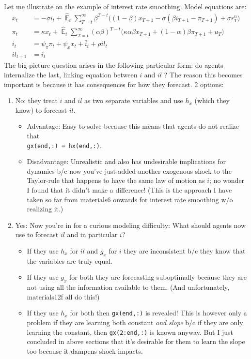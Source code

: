 \documentclass[11pt]{article}
\renewcommand{\[}{\begin{equation}}
\renewcommand{\]}{\end{equation}}
\DeclareMathOperator{\E}{\mathbb{E}}
\begin{document}
Let me illustrate on the example of interest rate smoothing. Model equations are:
\begin{align*}
x_t &=  -\sigma i_t +\hat{\E}_t \sum_{T=t}^{\infty} \beta^{T-t }\big( (1-\beta)x_{T+1} - \sigma(\beta i_{T+1} - \pi_{T+1}) +\sigma r_T^n \big)   \\
\pi_t &= \kappa x_t +\hat{\E}_t \sum_{T=t}^{\infty} (\alpha\beta)^{T-t }\big( \kappa \alpha \beta x_{T+1} + (1-\alpha)\beta \pi_{T+1} + u_T\big)  \\
i_t &= \psi_{\pi}\pi_t + \psi_{x} x_t   + \bar{i}_t + \rho il_t \\
il_{t+1} & = i_t 
\end{align*}
The big-picture question arises in the following particular form: do agents internalize the last, linking equation between $i$ and $il$ ?
The reason this becomes important is because it has consequences for how they forecast. 2 options:
\begin{enumerate}
\item No: they treat $i$ and $il$ as two separate variables and use $h_x$ (which they know) to forecast $ il $.
\begin{itemize}
\item Advantage: Easy to solve because this means that agents do not realize that \\ \texttt{gx(end,:) = hx(end,:)}.
\item Disadvantage: Unrealistic and also has undesirable implications for dynamics b/c now you've just added another exogenous shock to the Taylor-rule that happens to have the same law of motion as $i$; no wonder I found that it didn't make a difference! (This is the approach I have taken so far from materials6 onwards for interest rate smoothing w/o realizing it.)
\end{itemize}
\item Yes: Now you're in for a curious modeling difficulty: What should agents now use to forecast $il$ and in particular $i$?
\begin{itemize}
\item If they use $h_x$ for $il$ and $g_x$ for $i$ they are inconsistent b/c they know that the variables are truly equal.
\item If they use $g_x$ for both they are forecasting suboptimally because they are not using all the information available to them. (And unfortunately, materials12f all do this!)
\item If they use $h_x$ for both then \texttt{gx(end,:)} is revealed! This is however only a problem if they are learning both constant \emph{and slope} b/c if they are only learning the constant, then  \texttt{gx(2:end,:)} is known anyway. But I just concluded in above sections that it's desirable for them to learn the slope too because it dampens shock impacts.
\end{itemize}
\end{enumerate}
\end{document}
